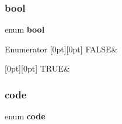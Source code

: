 \subsubsection{bool}
{\footnotesize\ttfamily enum {\bf bool}}

\begin{DoxyEnumFields}{Enumerator}
[0pt][0pt]{}\label{constants_8h_af6a258d8f3ee5206d682d799316314b1aa1e095cc966dbecf6a0d8aad75348d1a} 
F\+A\+L\+SE&\\
\hline

[0pt][0pt]{}\label{constants_8h_af6a258d8f3ee5206d682d799316314b1aa82764c3079aea4e60c80e45befbb839} 
T\+R\+UE&\\
\hline

\end{DoxyEnumFields}
\label{constants_8h_afb9ed1b8a27eb20854efe6e23e297683} 
\subsubsection{code}
{\footnotesize\ttfamily enum {\bf code}}

